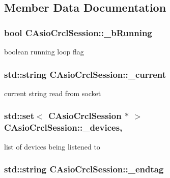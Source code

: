 \subsection{Member Data Documentation}
\hypertarget{classCAsioCrclSession_ac97a9f193eb4f46f1d144b6fabbe57d5}{
\subsubsection[{\-\_\-b\-Running}]{\setlength{\rightskip}{0pt plus 5cm}bool C\-Asio\-Crcl\-Session\-::\-\_\-b\-Running\hspace{0.3cm}{\ttfamily [protected]}}}\label{classCAsioCrclSession_ac97a9f193eb4f46f1d144b6fabbe57d5}
boolean running loop flag \hypertarget{classCAsioCrclSession_a83efc0f203f9775669ad7853fdea60ec}{
\subsubsection[{\-\_\-current}]{\setlength{\rightskip}{0pt plus 5cm}std\-::string C\-Asio\-Crcl\-Session\-::\-\_\-current\hspace{0.3cm}{\ttfamily [protected]}}}\label{classCAsioCrclSession_a83efc0f203f9775669ad7853fdea60ec}
current string read from socket \hypertarget{classCAsioCrclSession_a4aa68b6c8b8196d9ed9b3f35666a3d68}{
\subsubsection[{\-\_\-devices}]{\setlength{\rightskip}{0pt plus 5cm}std\-::set$<$ {\bf C\-Asio\-Crcl\-Session} $\ast$ $>$ C\-Asio\-Crcl\-Session\-::\-\_\-devices\hspace{0.3cm}{\ttfamily [static]}, {\ttfamily [protected]}}}\label{classCAsioCrclSession_a4aa68b6c8b8196d9ed9b3f35666a3d68}
list of devices being listened to \hypertarget{classCAsioCrclSession_afff0bce2718c39db205c779ade8120bd}{
\subsubsection[{\-\_\-endtag}]{\setlength{\rightskip}{0pt plus 5cm}std\-::string C\-Asio\-Crcl\-Session\-::\-\_\-endtag\hspace{0.3cm}{\ttfamily [protected]}}}\label{classCAsioCrclSession_afff0bce2718c39db205c779ade8120bd}
